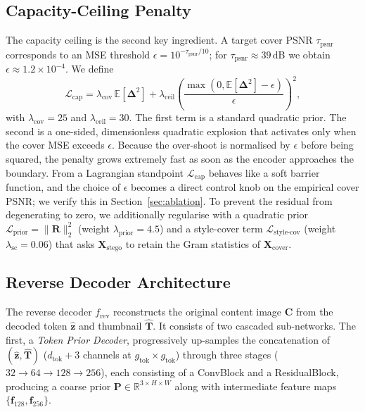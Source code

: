\documentclass[conference]{IEEEtran}
\begin{document}
\subsection{Capacity-Ceiling Penalty}
\label{sec:ceil}
The capacity ceiling is the second key ingredient. A target cover PSNR $\tau_{\text{psnr}}$ corresponds to an MSE threshold $\epsilon = 10^{-\tau_{\text{psnr}}/10}$; for $\tau_{\text{psnr}}\!\approx\!39$\,dB we obtain $\epsilon\!\approx\!1.2\!\times\!10^{-4}$. We define
\begin{equation}
    \mathcal{L}_{\text{cap}} = \lambda_{\text{cov}}\,\mathbb{E}[\boldsymbol{\Delta}^2] + \lambda_{\text{ceil}} \left(\frac{\max\!\left(0,\mathbb{E}[\boldsymbol{\Delta}^2]-\epsilon\right)}{\epsilon}\right)^{\!2},
    \label{eq:cap}
\end{equation}
with $\lambda_{\text{cov}}\!=\!25$ and $\lambda_{\text{ceil}}\!=\!30$. The first term is a standard quadratic prior. The second is a one-sided, dimensionless quadratic explosion that activates only when the cover MSE exceeds $\epsilon$. Because the over-shoot is normalised by $\epsilon$ before being squared, the penalty grows extremely fast as soon as the encoder approaches the boundary. From a Lagrangian standpoint $\mathcal{L}_{\text{cap}}$ behaves like a soft barrier function, and the choice of $\epsilon$ becomes a direct control knob on the empirical cover PSNR; we verify this in Section~\ref{sec:ablation}. To prevent the residual from degenerating to zero, we additionally regularise with a quadratic prior $\mathcal{L}_{\text{prior}}=\|\mathbf{R}\|_2^2$ (weight $\lambda_{\text{prior}}\!=\!4.5$) and a style-cover term $\mathcal{L}_{\text{style-cov}}$ (weight $\lambda_{\text{sc}}\!=\!0.06$) that asks $\mathbf{X}_{\text{stego}}$ to retain the Gram statistics of $\mathbf{X}_{\text{cover}}$.

\subsection{Reverse Decoder Architecture}
\label{sec:revdec}
The reverse decoder $f_{\text{rev}}$ reconstructs the original content image $\mathbf{C}$ from the decoded token $\hat{\mathbf{z}}$ and thumbnail $\hat{\mathbf{T}}$. It consists of two cascaded sub-networks. The first, a \emph{Token Prior Decoder}, progressively up-samples the concatenation of $(\hat{\mathbf{z}},\hat{\mathbf{T}})$ ($d_{\text{tok}}{+}3$ channels at $g_{\text{tok}}\!\times\!g_{\text{tok}}$) through three stages ($32\!\to\!64\!\to\!128\!\to\!256$), each consisting of a ConvBlock and a ResidualBlock, producing a coarse prior $\mathbf{P}\!\in\!\mathbb{R}^{3\times H\times W}$ along with intermediate feature maps $\{\mathbf{f}_{128},\mathbf{f}_{256}\}$.
\end{document}
